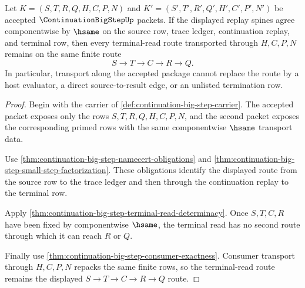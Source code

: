 \begin{theorem}
\label{thm:continuation-bigstep-replay-route-stability}
Let $K=(S,T,R,Q,H,C,P,N)$ and $K'=(S',T',R',Q',H',C',P',N')$ be accepted $\ContinuationBigStepUp$ packets. If the displayed replay spines agree componentwise by $\hsame$ on the source row, trace ledger, continuation replay, and terminal row, then every terminal-read route transported through $H,C,P,N$ remains on the same finite route
$$
S \to T \to C \to R \to Q.
$$
In particular, transport along the accepted package cannot replace the route by a host evaluator, a direct source-to-result edge, or an unlisted termination row.
\end{theorem}
\begin{proof}
Begin with the carrier of \autoref{def:continuation-big-step-carrier}. The accepted packet exposes only the rows $S,T,R,Q,H,C,P,N$, and the second packet exposes the corresponding primed rows with the same componentwise $\hsame$ transport data.

Use \autoref{thm:continuation-big-step-namecert-obligations} and \autoref{thm:continuation-big-step-small-step-factorization}. These obligations identify the displayed route from the source row to the trace ledger and then through the continuation replay to the terminal row.

Apply \autoref{thm:continuation-big-step-terminal-read-determinacy}. Once $S,T,C,R$ have been fixed by componentwise $\hsame$, the terminal read has no second route through which it can reach $R$ or $Q$.

Finally use \autoref{thm:continuation-big-step-consumer-exactness}. Consumer transport through $H,C,P,N$ repacks the same finite rows, so the terminal-read route remains the displayed $S \to T \to C \to R \to Q$ route.
\end{proof}

